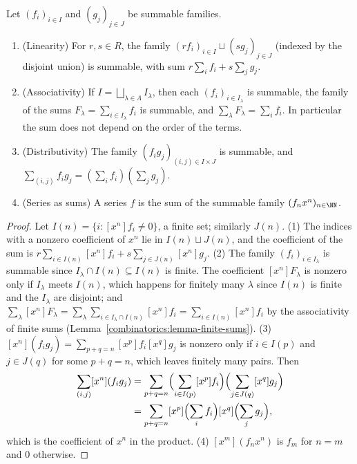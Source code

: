 \begin{proposition}\label{generating-functions:proposition-summable}
Let $(f_i)_{i \in I}$ and $(g_j)_{j \in J}$ be summable families.
\begin{enumerate}
\item (Linearity) For $r, s \in R$, the family $(rf_i)_{i \in I} \sqcup (sg_j)_{j \in J}$ (indexed by the disjoint union) is summable, with sum $r\sum_if_i + s\sum_jg_j$.
\item (Associativity) If $I = \bigsqcup_{\lambda \in \Lambda}I_\lambda$, then each $(f_i)_{i \in I_\lambda}$ is summable, the family of the sums $F_\lambda = \sum_{i \in I_\lambda}f_i$ is summable,
and $\sum_\lambda F_\lambda = \sum_if_i$. In particular the sum does not depend on the order of the terms.
\item (Distributivity) The family $(f_ig_j)_{(i, j) \in I \times J}$ is summable, and $\sum_{(i,j)}f_ig_j = (\sum_if_i)(\sum_jg_j)$.
\item (Series as sums) A series $f$ is the sum of the summable family $(f_nx^n)_{n \in \NN}$.
\end{enumerate}
\end{proposition}

\begin{proof}
Let $I(n) = \{i : [x^n]f_i \neq 0\}$, a finite set; similarly $J(n)$.
(1) The indices with a nonzero coefficient of $x^n$ lie in $I(n) \sqcup J(n)$, and the coefficient of the sum is $r\sum_{i \in I(n)}[x^n]f_i + s\sum_{j \in J(n)}[x^n]g_j$.
(2) The family $(f_i)_{i \in I_\lambda}$ is summable since $I_\lambda \cap I(n) \subseteq I(n)$ is finite. The coefficient $[x^n]F_\lambda$ is nonzero only if $I_\lambda$ meets $I(n)$, which happens for
finitely many $\lambda$ since $I(n)$ is finite and the $I_\lambda$ are disjoint; and $\sum_\lambda[x^n]F_\lambda = \sum_\lambda\sum_{i \in I_\lambda \cap I(n)}[x^n]f_i = \sum_{i \in I(n)}[x^n]f_i$ by
the associativity of finite sums (Lemma~\ref{combinatorics:lemma-finite-sums}).
(3) $[x^n](f_ig_j) = \sum_{p+q=n}[x^p]f_i[x^q]g_j$ is nonzero only if $i \in I(p)$ and $j \in J(q)$ for some $p + q = n$, which leaves finitely many pairs. Then
\[
\begin{aligned}
\sum_{(i,j)}[x^n](f_ig_j) &= \sum_{p+q=n}\Bigl(\sum_{i \in I(p)}[x^p]f_i\Bigr)\Bigl(\sum_{j \in J(q)}[x^q]g_j\Bigr)\\
&= \sum_{p+q=n}[x^p]\Bigl(\sum_if_i\Bigr)[x^q]\Bigl(\sum_jg_j\Bigr),
\end{aligned}
\]
which is the coefficient of $x^n$ in the product.
(4) $[x^m](f_nx^n)$ is $f_m$ for $n = m$ and $0$ otherwise.
\end{proof}

